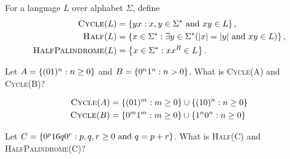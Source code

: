 \begin{problem}
  For a language $L$ over alphabet $\Sigma$, define
  \begin{align*}
    \textsc{Cycle}(L) &= \left\{yx : x, y \in \Sigma^* \text{ and } xy \in L\right\},\\
    \textsc{Half}(L) &= \left\{x \in \Sigma^* : \exists y \in \Sigma^* (\lvert x\rvert = \lvert y\rvert \text{ and } xy \in L)\right\},\\
    \textsc{HalfPalindrome}(L) &= \left\{x \in \Sigma^* : xx^R \in L \right\}.\\
  \end{align*}
  \begin{enumalph}
    \item Let $A = \left\{(01)^n : n \geq 0\right\}$ and $B = \left\{0^n1^n : n > 0\right\}$.
      What is \textsc{Cycle}(A) and \textsc{Cycle}(B)?
      \begin{Answer}
        \begin{align*}
          \textsc{Cycle}(A) &= \left\{(01)^m : m \ge 0\right\} \cup \left\{(10)^n : n \ge 0\right\}\\
          \textsc{Cycle}(B) &= \left\{0^m1^m : m \ge 0\right\} \cup \left\{1^n0^n : n \ge 0\right\}
        \end{align*}
      \end{Answer}

    \item Let $C = \left\{0^p16q0^r : p, q, r \ge 0 \text{ and } q = p + r\right\}$.
      What is \textsc{Half}(C) and \textsc{HalfPalindrome}(C)?
      \begin{Answer}
        
      \end{Answer}
  \end{enumalph}
\end{problem}
